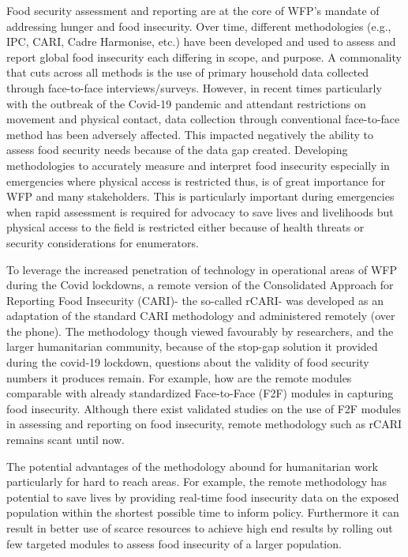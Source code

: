 \documentclass[11pt,harvard]{article}
\begin{document}
Food security assessment and reporting are at the core of WFP’s mandate of addressing hunger and food insecurity. Over time, different methodologies (e.g., IPC, CARI, Cadre Harmonise, etc.) have been developed and used to assess and report global food insecurity each differing in scope, and purpose. A commonality that cuts across all methods is the use of primary household data collected through face-to-face interviews/surveys. However, in recent times particularly with the outbreak of the Covid-19 pandemic and attendant restrictions on movement and physical contact, data collection through conventional face-to-face method has been adversely affected. This impacted negatively the ability to assess food security needs because of the data gap created. Developing methodologies to accurately measure and interpret food insecurity especially in emergencies where physical access is restricted thus, is of great importance for WFP and many stakeholders. This is particularly important during emergencies when rapid assessment is required for advocacy to save lives and livelihoods but physical access to the field is restricted either because of health threats or security considerations for enumerators. 

To leverage the increased penetration of technology in operational areas of WFP during the Covid lockdowns, a remote version of the Consolidated Approach for Reporting Food Insecurity (CARI)- the so-called rCARI- was developed as an adaptation of the standard CARI methodology and administered remotely (over the phone). The methodology though viewed favourably by researchers, and the larger humanitarian community, because of the stop-gap solution it provided during the covid-19 lockdown, questions about the validity of food security numbers it produces remain. For example, how are the remote modules comparable with already standardized Face-to-Face (F2F) modules in capturing food insecurity. Although there exist validated studies on the use of F2F modules in assessing and reporting on food insecurity, remote methodology such as rCARI remains scant until now. 

The potential advantages of the methodology abound for humanitarian work particularly for hard to reach areas. For example, the remote methodology has potential to save lives by providing real-time food insecurity data on the exposed population within the shortest possible time to inform policy. Furthermore it can result in better use of scarce resources to achieve high end results by rolling out few targeted modules to assess food insecurity of a larger population.  	
\end{document}
